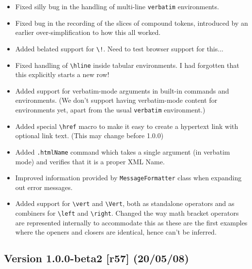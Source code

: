 \begin{itemize}

  \item Fixed silly bug in the handling of multi-line \verb|verbatim|
  environments.

  \item Fixed bug in the recording of the slices of compound tokens, introduced
  by an earlier over-simplification to how this all worked.

  \item Added belated support for \verb|\!|. Need to test browser support for
  this...

  \item Fixed handling of \verb|\hline| inside tabular environments. I had
  forgotten that this explicitly starts a new row!

  \item Added support for verbatim-mode arguments in built-in commands and
  environments.  (We don't support having verbatim-mode content for
  environments yet, apart from the usual \verb|verbatim| environment.)

  \item Added special \verb|\href| macro to make it easy to create a hypertext
  link with optional link text. (This may change before 1.0.0)

  \item Added \verb|.htmlName| command which takes a single argument (in
  verbatim mode) and verifies that it is a proper XML Name.

  \item Improved information provided by \verb|MessageFormatter| class when
  expanding out error messages.

  \item Added support for \verb|\vert| and \verb|\Vert|, both as standalone
  operators and as combiners for \verb|\left| and \verb|\right|. Changed the
  way math bracket operators are represented internally to accommodate this as
  these are the first examples where the openers and closers are identical,
  hence can't be inferred.

\end{itemize}

\subsection*{Version 1.0.0-beta2 [r57] (20/05/08)}

